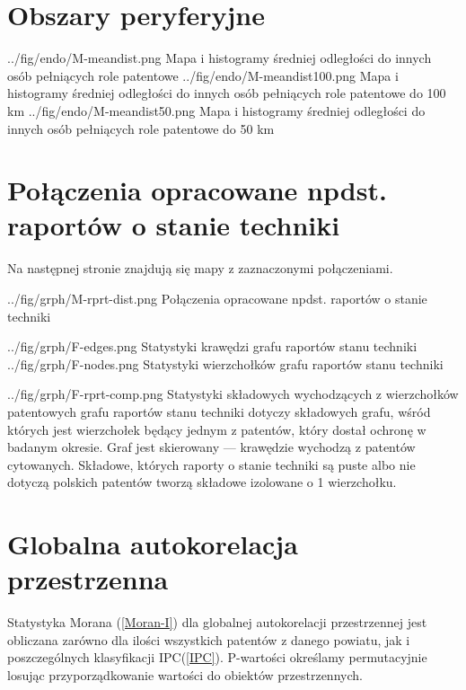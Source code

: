     \newpage\section
  {Obszary peryferyjne}

  \newpage\charttripled
{../fig/endo/M-meandist.png}
{ Mapa i histogramy średniej odległości do innych osób pełniących role patentowe }
{../fig/endo/M-meandist100.png}
{ Mapa i histogramy średniej odległości do innych osób pełniących role patentowe do 100 km }
{../fig/endo/M-meandist50.png}
{ Mapa i histogramy średniej odległości do innych osób pełniących role patentowe do 50 km }




    \newpage\section
  {Połączenia opracowane npdst. raportów o stanie techniki}

Na następnej stronie znajdują się mapy z zaznaczonymi połączeniami.

\newpage

  \chart
{../fig/grph/M-rprt-dist.png}
{ Połączenia opracowane npdst. raportów o stanie techniki }\newpage

  \chartduo
{../fig/grph/F-edges.png}
{ Statystyki krawędzi grafu raportów stanu techniki }
{../fig/grph/F-nodes.png}
{ Statystyki wierzchołków grafu raportów stanu techniki }

  \chartside
{../fig/grph/F-rprt-comp.png}
{ Statystyki składowych wychodzących z wierzchołków patentowych
  grafu raportów stanu techniki }{
 dotyczy składowych grafu, wśród których
jest wierzchołek będący jednym z patentów, który dostał ochronę w badanym okresie.
Graf jest skierowany --- krawędzie wychodzą z patentów cytowanych.
Składowe, których raporty o stanie techniki są puste albo nie dotyczą 
polskich patentów tworzą składowe izolowane o 1 wierzchołku.
}



    \newpage\section
  {Globalna autokorelacja przestrzenna}

Statystyka Morana (\cref{Moran-I}) dla globalnej autokorelacji przestrzennej
jest obliczana zarówno dla ilości wszystkich patentów z danego powiatu, 
jak i poszczególnych klasyfikacji \ac{IPC}(\cref{IPC}).
P-wartości określamy permutacyjnie losując przyporządkowanie wartości
do obiektów przestrzennych\cite{pysal-07}.

